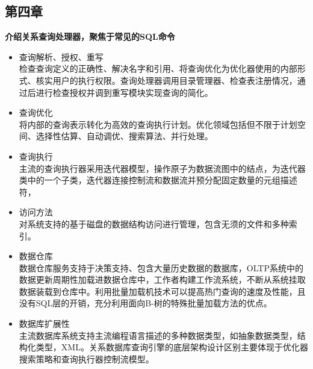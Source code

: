 \documentclass[UTF8,14pt]{article}
\numberwithin{figure}{section}
\begin{document}
\subsection{第四章}
\textbf{介绍关系查询处理器，聚焦于常见的SQL命令}
\begin{itemize}
      \item 查询解析、授权、重写\\
            检查查询定义的正确性、解决名字和引用、将查询优化为优化器使用的内部形式、核实用户的执行权限。查询处理器调用目录管理器、检查表注册情况，通过后进行检查授权并调到重写模块实现查询的简化。
      \item 查询优化\\
            将内部的查询表示转化为高效的查询执行计划。优化领域包括但不限于计划空间、选择性估算、自动调优、搜索算法、并行处理。
      \item 查询执行\\
            主流的查询执行器采用迭代器模型，操作原子为数据流图中的结点，为迭代器类中的一个子类，迭代器连接控制流和数据流并预分配固定数量的元组描述符，
      \item 访问方法\\
            对系统支持的基于磁盘的数据结构访问进行管理，包含无须的文件和多种索引。
      \item 数据仓库\\
            数据仓库服务支持于决策支持、包含大量历史数据的数据库，OLTP系统中的数据更新周期性加载进数据仓库中，工作者构建工作流系统，不断从系统挂取数据装载到仓库中。利用批量加载机技术可以提高热门查询的速度及性能，且没有SQL层的开销，充分利用面向B-树的特殊批量加载方法的优点。
      \item 数据库扩展性\\
            主流数据库系统支持主流编程语言描述的多种数据类型，如抽象数据类型，结构化类型，XML。关系数据库查询引擎的底层架构设计区别主要体现于优化器搜索策略和查询执行器控制流模型。
\end{itemize}
\end{document}
